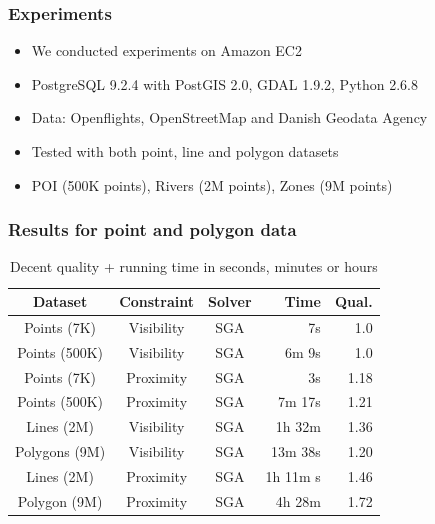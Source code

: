 \documentclass{beamer}
\begin{document}
\frame
{
	\frametitle{Experiments}
	\begin{itemize}[<+->]
	\item We conducted experiments on Amazon EC2
	\item PostgreSQL 9.2.4 with PostGIS 2.0, GDAL 1.9.2, Python 2.6.8
	\item Data: Openflights, OpenStreetMap and Danish Geodata Agency
	\item Tested with both point, line and polygon datasets
	\item POI (500K points), Rivers (2M points), Zones (9M points)
	\end{itemize}
}

\frame
{
	\frametitle{Results for point and polygon data}
\begin{table}[htdp]
\vspace{-2ex}
\begin{center}
\begin{tabular}{|c|c|c|r|r|}
\hline
\textbf{Dataset} & \textbf{Constraint} & \textbf{Solver} & \textbf{Time} & \textbf{Qual.}\\ 
\hline
Points (7K)  & Visibility & SGA & 7s & 1.0 \\
Points (500K) & Visibility & SGA & 6m 9s & 1.0 \\
Points (7K)  & Proximity  & SGA & 3s & 1.18 \\
Points (500K) & Proximity & SGA & 7m 17s & 1.21 \\
\hline
Lines (2M) & Visibility & SGA & 1h 32m & 1.36 \\
Polygons (9M) & Visibility & SGA & 13m 38s & 1.20 \\
Lines (2M)  & Proximity  & SGA& 1h 11m s & 1.46 \\
Polygon (9M) & Proximity & SGA & 4h 28m & 1.72 \\
\hline
\end{tabular}
\end{center}
\caption{Decent quality + running time in seconds, minutes or hours}
\label{tab:complex:overview}
\vspace{-6ex}
\end{table}%


}
\end{document}
